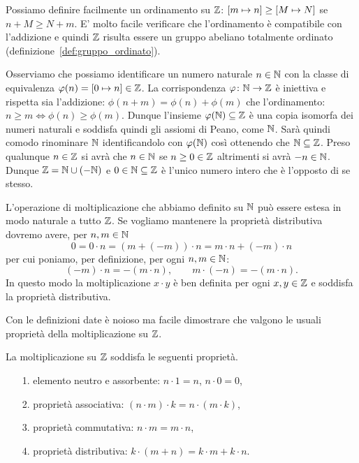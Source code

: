Possiamo definire facilmente un ordinamento su ${\mathbb Z}$:
${\left[ m\mapsto n \right]} \ge {\left[ M\mapsto N \right]}$ se 
$n+M\ge N+m$.
E' molto facile verificare che l'ordinamento è compatibile 
con l'addizione e quindi ${\mathbb Z}$ risulta essere un 
gruppo abeliano totalmente ordinato (definizione~\ref{def:gruppo_ordinato}).

Osserviamo che possiamo identificare un numero naturale $n\in {\mathbb N}$ 
con la classe di equivalenza $\varphi(n) = {\left[ 0\mapsto n \right]}\in {\mathbb Z}$.
La corrispondenza $\varphi\colon {\mathbb N}\to{\mathbb Z}$ è iniettiva e rispetta sia l'addizione:
$\phi(n+m) = \phi(n)+\phi(m)$ che l'ordinamento: $n\ge m \iff \phi(n)\ge \phi(m)$.
Dunque l'insieme $\varphi({\mathbb N})\subseteq {\mathbb Z}$ è una copia isomorfa dei 
numeri naturali e soddisfa quindi gli assiomi di Peano, come ${\mathbb N}$.
%
Sarà quindi comodo rinominare ${\mathbb N}$ identificandolo con $\varphi({\mathbb N})$ così 
ottenendo che ${\mathbb N}\subseteq {\mathbb Z}$.
Preso qualunque $n\in {\mathbb Z}$ si avrà che $n\in {\mathbb N}$ se $n\ge 0\in {\mathbb Z}$ 
altrimenti  si avrà $-n\in {\mathbb N}$. 
Dunque ${\mathbb Z} = {\mathbb N} \cup (-{\mathbb N})$ e $0\in {\mathbb N}\subseteq {\mathbb Z}$ 
è l'unico numero intero che è l'opposto di se stesso.

L'operazione di moltiplicazione che abbiamo definito su ${\mathbb N}$ può essere 
estesa in modo naturale a tutto ${\mathbb Z}$. 
Se vogliamo mantenere la proprietà distributiva dovremo avere, 
per $n,m\in{\mathbb N}$
\[
  0 = 0 \cdot n = (m+(-m))\cdot n = m\cdot n + (-m)\cdot n
\]
per cui poniamo, per definizione, per ogni $n,m\in {\mathbb N}$:
\[
  (-m) \cdot n = -(m\cdot n), \qquad  m \cdot (-n) = -(m\cdot n).
\]
In questo modo la moltiplicazione $x\cdot y$ 
è ben definita per ogni $x,y\in {\mathbb Z}$ e soddisfa la proprietà distributiva.

Con le definizioni date è noioso ma facile dimostrare 
che valgono le usuali proprietà della
moltiplicazione su ${\mathbb Z}$.

\begin{theorem}
  La moltiplicazione su ${\mathbb Z}$ soddisfa le seguenti proprietà.
  \begin{enumerate}
    \item[1.] elemento neutro e assorbente: $n\cdot 1 = n$, $n\cdot 0 = 0$,
    \item[2.] proprietà associativa: $(n\cdot m)\cdot k = n \cdot (m\cdot k)$,
    \item[3.] proprietà commutativa: $n\cdot m = m\cdot n$,
    \item[4.] proprietà distributiva: $k\cdot(m+n) = k\cdot m + k\cdot n$. 
  \end{enumerate}
\end{theorem}

